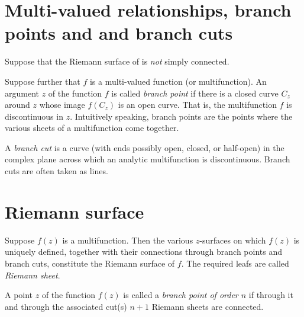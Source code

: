  \section{Multi-valued relationships, branch points and and branch cuts}

Suppose that the  Riemann surface of is {\em not} simply connected.

Suppose further that $f$ is a  multi-valued function (or multifunction).
An argument
$z$ of the function $f$ is called
{\em branch point}
if there is a closed curve $C_z$ around $z$ whose image $f(C_z)$ is an open curve.
That is, the multifunction $f$ is discontinuous in $z$.
Intuitively speaking, branch points are the points where the various sheets of a multifunction come together.

A {\em branch cut} is a curve (with ends possibly open, closed, or half-open)
in the complex plane across which an analytic multifunction is discontinuous.
Branch cuts are often taken as lines.

 \section{Riemann surface}
Suppose $f(z)$ is a multifunction.
Then the various $z$-surfaces on which $f(z)$ is uniquely defined,
together with their connections through branch points and branch cuts,
constitute  the Riemann surface of $f$.
The required leafs are called {\em Riemann sheet}.

A point $z$ of the function $f(z)$ is called a {\em branch point of order $n$} if through it and through the associated cut(s)
$n+1$ Riemann sheets are connected.


